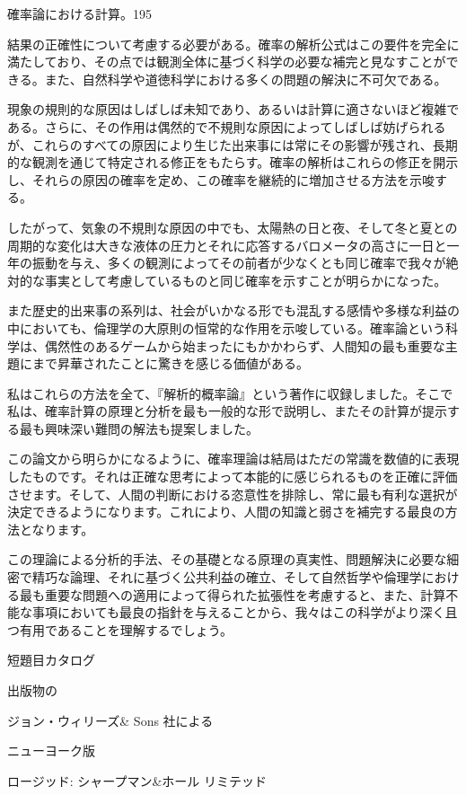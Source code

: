 \documentclass[a4paper,11pt,openany]{ltjsbook}
\begin{document}
確率論における計算。195

結果の正確性について考慮する必要がある。確率の解析公式はこの要件を完全に満たしており、その点では観測全体に基づく科学の必要な補完と見なすことができる。また、自然科学や道徳科学における多くの問題の解決に不可欠である。

現象の規則的な原因はしばしば未知であり、あるいは計算に適さないほど複雑である。さらに、その作用は偶然的で不規則な原因によってしばしば妨げられるが、これらのすべての原因により生じた出来事には常にその影響が残され、長期的な観測を通じて特定される修正をもたらす。確率の解析はこれらの修正を開示し、それらの原因の確率を定め、この確率を継続的に増加させる方法を示唆する。

したがって、気象の不規則な原因の中でも、太陽熱の日と夜、そして冬と夏との周期的な変化は大きな液体の圧力とそれに応答するバロメータの高さに一日と一年の振動を与え、多くの観測によってその前者が少なくとも同じ確率で我々が絶対的な事実として考慮しているものと同じ確率を示すことが明らかになった。

また歴史的出来事の系列は、社会がいかなる形でも混乱する感情や多様な利益の中においても、倫理学の大原則の恒常的な作用を示唆している。確率論という科学は、偶然性のあるゲームから始まったにもかかわらず、人間知の最も重要な主題にまで昇華されたことに驚きを感じる価値がある。

私はこれらの方法を全て、『解析的概率論』という著作に収録しました。そこで私は、確率計算の原理と分析を最も一般的な形で説明し、またその計算が提示する最も興味深い難問の解法も提案しました。

この論文から明らかになるように、確率理論は結局はただの常識を数値的に表現したものです。それは正確な思考によって本能的に感じられるものを正確に評価させます。そして、人間の判断における恣意性を排除し、常に最も有利な選択が決定できるようになります。これにより、人間の知識と弱さを補完する最良の方法となります。

この理論による分析的手法、その基礎となる原理の真実性、問題解決に必要な細密で精巧な論理、それに基づく公共利益の確立、そして自然哲学や倫理学における最も重要な問題への適用によって得られた拡張性を考慮すると、また、計算不能な事項においても最良の指針を与えることから、我々はこの科学がより深く且つ有用であることを理解するでしょう。

短題目カタログ

出版物の

ジョン・ウィリーズ\& Sons 社による

ニューヨーク版

ロージッド: シャープマン\&ホール リミテッド
\end{document}
